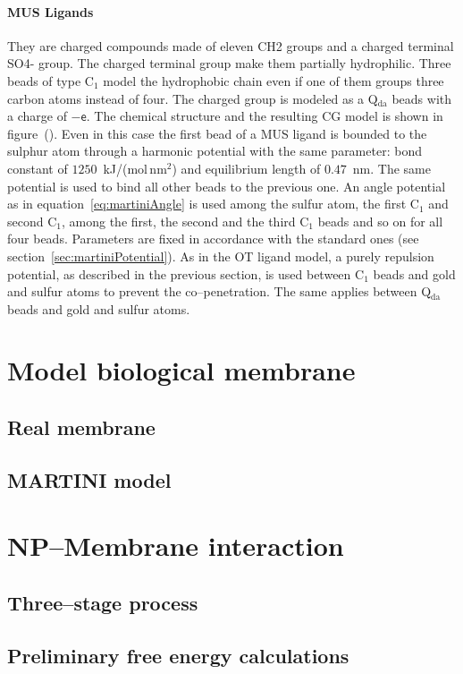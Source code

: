 \paragraph{\textbf{MUS Ligands}} They are charged compounds made of eleven \ac{CH2} groups and a charged terminal \ac{SO4-} group. The charged terminal group make them partially hydrophilic. Three \martini beads of type C$_1$ model the hydrophobic chain even if one of them groups three carbon atoms instead of four. The charged group is modeled as a Q$_\text{da}$ beads with a charge of $-\mathsf{e}$. The chemical structure and the resulting \ac{CG} \martini model is shown in figure~(). Even in this case the first bead of a \ac{MUS} ligand is bounded to the sulphur atom through a harmonic potential with the same parameter: bond constant of $1250$~kJ/(mol\,nm$^2$) and equilibrium length of $0.47$~nm. The same potential is used to bind all other beads to the previous one. An angle potential as in equation~\eqref{eq:martiniAngle} is used among the sulfur atom, the first C$_1$ and second C$_1$, among the first, the second and the third C$_1$ beads and so on for all four beads. Parameters are fixed in accordance with the standard \martini ones (see section~\ref{sec:martiniPotential}). As in the \ac{OT} ligand model, a purely repulsion potential, as described in the previous section, is used between C$_1$ beads and gold and sulfur atoms to prevent the co--penetration. The same applies between Q$_\text{da}$ beads and gold and sulfur atoms.

\section{Model biological membrane}

\subsection{Real membrane}

\subsection{MARTINI model}

\section{NP--Membrane interaction}

\subsection{Three--stage process}

\subsection{Preliminary free energy calculations}